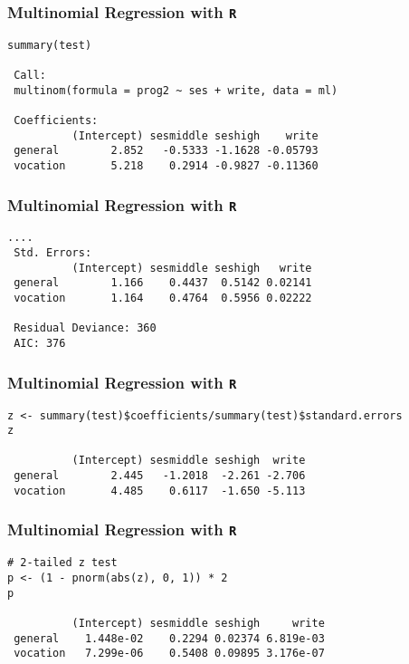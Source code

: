 \documentclass[00-GLMregslides.tex]{subfiles}
\begin{document}
\begin{frame}[fragile]

\frametitle{Multinomial Regression with \texttt{R}}
\Large
\begin{framed}
	\begin{verbatim}
summary(test)
 
 Call:
 multinom(formula = prog2 ~ ses + write, data = ml)
 
 Coefficients:
          (Intercept) sesmiddle seshigh    write
 general        2.852   -0.5333 -1.1628 -0.05793
 vocation       5.218    0.2914 -0.9827 -0.11360
\end{verbatim}
\end{framed}
\end{frame}

\begin{frame}[fragile]

\frametitle{Multinomial Regression with \texttt{R}}
\Large
\begin{framed}
\begin{verbatim}
....
 Std. Errors:
          (Intercept) sesmiddle seshigh   write
 general        1.166    0.4437  0.5142 0.02141
 vocation       1.164    0.4764  0.5956 0.02222
 
 Residual Deviance: 360 
 AIC: 376
\end{verbatim}
\end{framed}
\end{frame}
\begin{frame}[fragile]

\frametitle{Multinomial Regression with \texttt{R}}
\Large
\begin{framed}
\begin{verbatim}
z <- summary(test)$coefficients/summary(test)$standard.errors
z
 
          (Intercept) sesmiddle seshigh  write
 general        2.445   -1.2018  -2.261 -2.706
 vocation       4.485    0.6117  -1.650 -5.113
 \end{verbatim}
\end{framed}
\end{frame}
\begin{frame}[fragile]

\frametitle{Multinomial Regression with \texttt{R}}
\Large
\begin{framed}
\begin{verbatim}
# 2-tailed z test
p <- (1 - pnorm(abs(z), 0, 1)) * 2
p
 
          (Intercept) sesmiddle seshigh     write
 general    1.448e-02    0.2294 0.02374 6.819e-03
 vocation   7.299e-06    0.5408 0.09895 3.176e-07
\end{verbatim}
\end{framed}
\end{frame}
\end{document}
